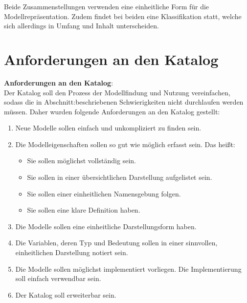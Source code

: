 Beide Zusammenstellungen verwenden eine einheitliche Form für die Modellrepräsentation. Zudem findet bei beiden eine Klassifikation statt, welche sich allerdings in Umfang und Inhalt unterscheiden.
\section{Anforderungen an den Katalog} %
\label{Ch:Vorbetrachtung:Sec:Anforderungen}
\textbf{Anforderungen an den Katalog}:\\ %
Der Katalog soll den Prozess der Modellfindung und Nutzung vereinfachen, sodass die in Abschnitt:\glqq {}\grqq beschriebenen Schwierigkeiten nicht durchlaufen werden müssen. Daher wurden folgende Anforderungen an den Katalog gestellt:
\begin{enumerate}[label=\textbf{Anforderung A.\arabic*}:, ref=\textbf{A.\arabic*}, wide=0pt, leftmargin=*]
	\item \label{A.Findbarkeit}Neue Modelle sollen einfach und unkompliziert zu finden sein.
	\item \label{A.Modelleigenschaften}Die Modelleigenschaften sollen so gut wie möglich erfasst sein. Das heißt:
	\begin{itemize}[label=$\bullet$]
		\item Sie sollen möglichst vollständig sein.
		\item Sie sollen in einer übersichtlichen Darstellung aufgelistet sein.
		\item Sie sollen einer einheitlichen Namensgebung folgen.
		\item Sie sollen eine klare Definition haben.
	\end{itemize}
	\item \label{A.Darstellung_Gleichungen}Die Modelle sollen eine einheitliche Darstellungsform haben.
	\item \label{A.Darstellung_Variablen}Die Variablen, deren Typ und Bedeutung sollen in einer sinnvollen, einheitlichen Darstellung notiert sein.
	\item \label{A.Implementierung}Die Modelle sollen möglichst implementiert vorliegen. Die Implementierung soll einfach verwendbar sein.
	\item \label{A.Erweiterbarkeit}Der Katalog soll erweiterbar sein. %
\end{enumerate}
